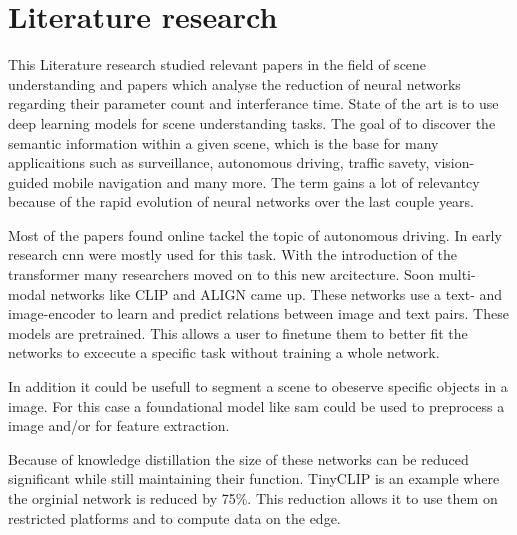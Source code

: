 \chapter{Literature research}

This Literature research studied relevant papers in the field of scene understanding
and papers which analyse the reduction of neural networks regarding their parameter count and interferance time.
State of the art is to use deep learning models for scene understanding tasks.
The goal of to discover the semantic information within a given scene, which is the base for many applicaitions such as surveillance, autonomous driving, traffic savety, vision-guided mobile navigation and many more.
The term gains a lot of relevantcy because of the rapid evolution of neural networks over the last couple years.

Most of the papers found online tackel the topic of autonomous driving\cite{sceneunderstandingautdriving1}.
In early research \acrfull{cnn}\cite{SegNet} were mostly used for this task.
With the introduction of the transformer \cite{attentionisallyouneed} many researchers moved on to this new arcitecture.
Soon multi-modal networks like CLIP\cite{clip} and ALIGN\cite{ALIGN} came up.
These networks use a text- and image-encoder to learn and predict relations between image and text pairs.
These models are pretrained.
This allows a user to finetune them to better fit the networks to excecute a specific task without training a whole network.

In addition it could be usefull to segment a scene to obeserve specific objects in a image.
For this case a foundational model like \Acrfull{sam}\cite{sam} could be used to preprocess a image and/or for feature extraction.

Because of knowledge distillation\cite{knowledgedistillation} the size of these networks can be reduced significant while still maintaining their function.
TinyCLIP\cite{tinyclip} is an example where the orginial network is reduced by 75\%.
This reduction allows it to use them on restricted platforms and to compute data on the edge.

